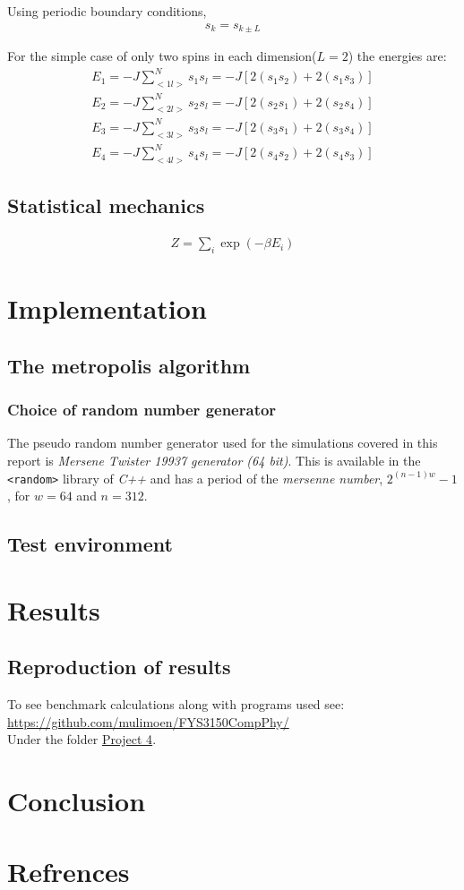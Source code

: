 \documentclass[11pt,a4paper,english]{article}
\numberwithin{equation}{section}
\begin{document}
Using periodic boundary conditions,
\begin{gather}
s_k = s_{k \pm L}
\end{gather}

For the simple case of only two spins in each dimension($L=2$) the energies are:
\begin{align*}
E_1 = -J\sum_{<1l>}^{N}s_1 s_l = -J[2(s_1 s_2)+2(s_1 s_3)] \\
E_2 = -J\sum_{<2l>}^{N}s_2 s_l = -J[2(s_2 s_1)+2(s_2 s_4)] \\
E_3 = -J\sum_{<3l>}^{N}s_3 s_l = -J[2(s_3 s_1)+2(s_3 s_4)] \\
E_4 = -J\sum_{<4l>}^{N}s_4 s_l = -J[2(s_4 s_2)+2(s_4 s_3)] 
\end{align*}


\subsection{Statistical mechanics}
\begin{gather}
Z = \sum_i \exp(-\beta E_i)
\end{gather}

\section{Implementation}

\subsection{The metropolis algorithm}

\subsubsection{Choice of random number generator}
The pseudo random number generator used for the simulations covered in this report is \emph{Mersene Twister 19937 generator (64 bit)}. This is available in the \texttt{<random>} library of \emph{C++} and has a period of the \emph{mersenne number}, $2^{(n-1)w}-1$, for $w=64$ and $n=312$.	

\subsection{Test environment}

\section{Results}

\subsection{Reproduction of results}

To see benchmark calculations along with programs used see:\\
\url{https://github.com/mulimoen/FYS3150CompPhy/}\\
Under the folder \url{Project 4}.

\section{Conclusion}

\section{Refrences}
\end{document}
